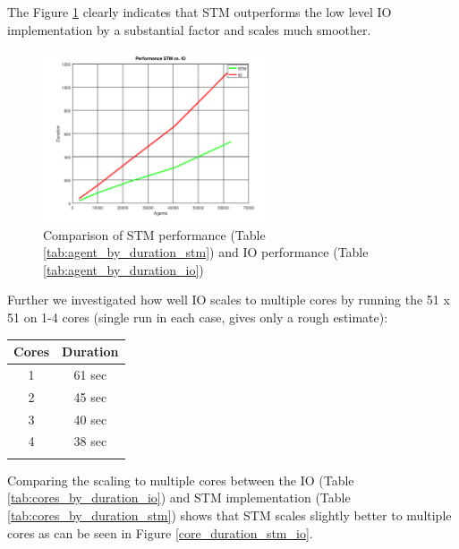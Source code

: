 The Figure \ref{fig:agent_by_duration} clearly indicates that STM outperforms the low level IO implementation by a substantial factor and scales much smoother.
\begin{figure}
	\centering
	\includegraphics[width=0.6\textwidth, angle=0]{./fig/agents_duration_stm_io.png}
	\caption{Comparison of STM performance (Table \ref{tab:agent_by_duration_stm}) and IO performance (Table \ref{tab:agent_by_duration_io})}
	\label{fig:agent_by_duration}
\end{figure}

Further we investigated how well IO scales to multiple cores by running the 51 x 51 on 1-4 cores (single run in each case, gives only a rough estimate):
\begin{center}
  \begin{tabular}{ c || c }
    Cores & Duration \\ \hline \hline 
    1 & 61 sec \\ \hline
    2 & 45 sec \\ \hline
    3 & 40 sec \\ \hline
    4 & 38 sec \\ \hline
    
    \label{tab:cores_by_duration_io}
  \end{tabular}
\end{center}

Comparing the scaling to multiple cores between the IO (Table \ref{tab:cores_by_duration_io}) and STM implementation (Table \ref{tab:cores_by_duration_stm}) shows that STM scales slightly better to multiple cores as can be seen in Figure \ref{core_duration_stm_io}.

